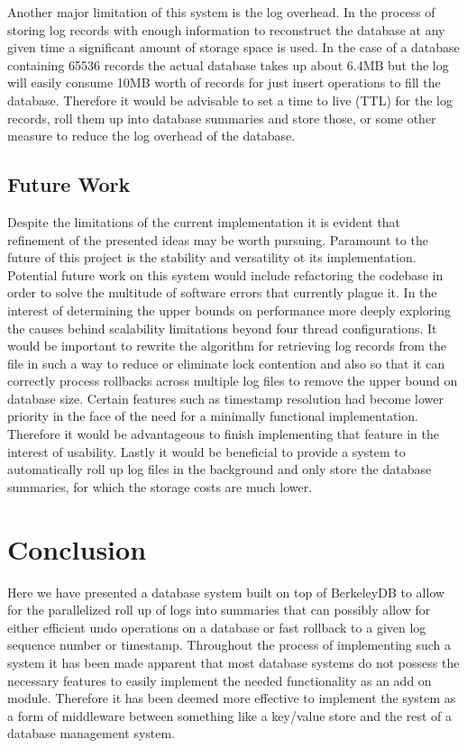 \documentclass{article}
\begin{document}
Another major limitation of this system is the log overhead. In the process of storing log records with enough information to reconstruct the database at any given time a significant amount of storage space is used. In the case of a database containing 65536 records the actual database takes up about 6.4MB but the log will easily consume 10MB worth of records for just insert operations to fill the database. Therefore it would be advisable to set a time to live (TTL) for the log records, roll them up into database summaries and store those, or some other measure to reduce the log overhead of the database.

\subsection{Future Work}
Despite the limitations of the current implementation it is evident that refinement of the presented ideas may be worth pursuing. 
Paramount to the future of this project is the stability and versatility ot its implementation. Potential future work on this system would include refactoring the codebase in order to solve the multitude of software errors that currently plague it. In the interest of determining the upper bounds on performance more deeply exploring the causes behind scalability limitations beyond four thread configurations. It would be important to rewrite the algorithm for retrieving log records from the file in such a way to reduce or eliminate lock contention and also so that it can correctly process rollbacks across multiple log files to remove the upper bound on database size. Certain features such as timestamp resolution had become lower priority in the face of the need for a minimally functional implementation. Therefore it would be advantageous to finish implementing that feature in the interest of usability. Lastly it would be beneficial to provide a system to automatically roll up log files in the background and only store the database summaries, for which the storage costs are much lower. 

\section{Conclusion}
Here we have presented a database system built on top of BerkeleyDB to allow for the parallelized roll up of logs into summaries that can possibly allow for either efficient undo operations on a database or fast rollback to a given log sequence number or timestamp. Throughout the process of implementing such a system it has been made apparent that most database systems do not possess the necessary features to easily implement the needed functionality as an add on module. Therefore it has been deemed more effective to implement the system as a form of middleware between something like a key/value store and the rest of a database management system. 
\end{document}
